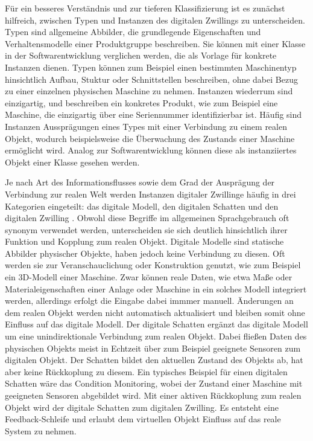 Für ein besseres Verständnis und zur tieferen Klassifizierung ist es zunächst hilfreich, zwischen Typen und Instanzen des digitalen Zwillings zu unterscheiden.
Typen sind allgemeine Abbilder, die grundlegende Eigenschaften und Verhaltensmodelle einer Produktgruppe beschreiben. 
Sie können mit einer Klasse in der Softwarentwicklung verglichen werden, die als Vorlage für konkrete Instanzen dienen.
Typen können zum Beispiel einen bestimmten Maschinentyp hinsichtlich Aufbau, Stuktur oder Schnittstellen beschreiben, ohne dabei Bezug zu einer einzelnen physischen Maschine zu nehmen.
Instanzen wiederrum sind einzigartig, und beschreiben ein konkretes Produkt, wie zum Beispiel eine Maschine, die einzigartig über eine Seriennummer identifizierbar ist.
Häufig sind Instanzen Aussprägungen eines Types mit einer Verbindung zu einem realen Objekt, wodurch beispielsweise die Überwachung des Zustands einer Maschine ermöglicht wird.
Analog zur Softwarentwicklung können diese als instanziiertes Objekt einer Klasse gesehen werden. \cite{ZEISS}

Je nach Art des Informationsflusses sowie dem Grad der Ausprägung der Verbindung zur realen Welt werden Instanzen digitaler Zwillinge häufig in drei Kategorien eingeteilt: das digitale Modell, den digitalen Schatten und den digitalen Zwilling \cite{ClassificationDT}.
Obwohl diese Begriffe im allgemeinen Sprachgebrauch oft synonym verwendet werden, unterscheiden sie sich deutlich hinsichtlich ihrer Funktion und Kopplung zum realen Objekt.
Digitale Modelle sind statische Abbilder physischer Objekte, haben jedoch keine Verbindung zu diesen. 
Oft werden sie zur Veranschauclichung oder Konstruktion genutzt, wie zum Beispiel ein 3D-Modell einer Maschine.
Zwar können reale Daten, wie etwa Maße oder Materialeigenschaften einer Anlage oder Maschine in ein solches Modell integriert werden, allerdings erfolgt die Eingabe dabei immmer manuell.
Änderungen an dem realen Objekt werden nicht automatisch aktualisiert und bleiben somit ohne Einfluss auf das digitale Modell.
Der digitale Schatten ergänzt das digitale Modell um eine unindirektionale Verbindung zum realen Objekt.
Dabei fließen Daten des physischen Objekts meist in Echtzeit über zum Beispiel geeignete Sensoren zum digitalen Objekt.
Der Schatten bildet den aktuellen Zustand des Objekts ab, hat aber keine Rückkoplung zu diesem.
Ein typisches Beispiel für einen digitalen Schatten wäre das Condition Monitoring, wobei der Zustand einer Maschine mit geeigneten Sensoren abgebildet wird.
Mit einer aktiven Rückkoplung zum realen Objekt wird der digitale Schatten zum digitalen Zwilling.
Es entsteht eine Feedback-Schleife und erlaubt dem virtuellen Objekt Einfluss auf das reale System zu nehmen.

